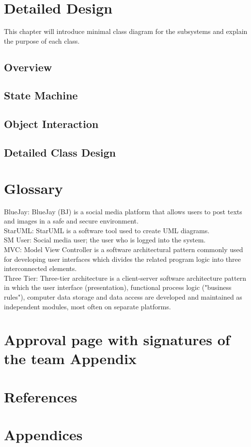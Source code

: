 \documentclass{report}
\begin{document}
\chapter{Detailed Design}
	This chapter will introduce minimal class diagram for the subsystems and explain the purpose of each class.
\section{Overview}
\section{State Machine}
\section{Object Interaction}
\section{Detailed Class Design}
\chapter{Glossary}
BlueJay: BlueJay (BJ) is a social media platform that allows users to post texts and images in a safe and secure environment.\\
StarUML: StarUML is a software tool used to create UML diagrams.\\
SM User: Social media user; the user who is logged into the system.\\
MVC: Model View Controller is a software architectural pattern commonly used for developing user interfaces which divides the related program logic into three interconnected elements.\\
Three Tier: Three-tier architecture is a client-server software architecture pattern in which the user interface (presentation), functional process logic ("business rules"), computer data storage and data access are developed and maintained as independent modules, most often on separate platforms.\\
\chapter{Approval page with signatures of the team Appendix} 
\chapter{References}
\chapter{Appendices}
\end{document}
